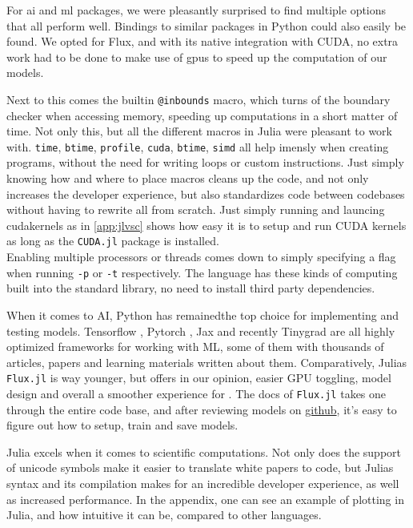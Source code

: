  For \acrshort{ai} and \acrshort{ml} packages, we were pleasantly surprised to find multiple options that all perform well. Bindings to similar packages in Python could also easily be found. We opted for Flux, and with its native integration with CUDA, no extra work had to be done to make use of \acrshort{gpu}s to speed up the computation of our models.

Next to this comes the builtin \texttt{@inbounds} macro, which turns of the boundary checker when accessing memory, speeding up computations in a short matter of time. Not only this, but all the different macros in Julia were pleasant to work with. \texttt{time}, \texttt{btime}, \texttt{profile}, \texttt{cuda}, \texttt{btime}, \texttt{simd} all help imensly when creating programs, without the need for writing loops or custom instructions. Just simply knowing how and where to place macros cleans up the code, and not only increases the developer experience, but also standardizes code between codebases without having to rewrite all from scratch. Just simply running and launcing cudakernels as in \ref{app:jlvsc} shows how easy it is to setup and run CUDA kernels as long as the \texttt{CUDA.jl} package is installed. \\

Enabling multiple processors or threads comes down to simply specifying a flag when running \texttt{-p} or \texttt{-t} respectively. The language has these kinds of computing built into the standard library, no need to install third party dependencies. 

When it comes to AI, Python has remainedthe top choice for implementing and testing models. Tensorflow \cite{abadi2016tensorflow}, Pytorch \cite{paszke2019pytorch}, Jax \cite{47008} and recently Tinygrad \cite{tinygrad} are all highly optimized frameworks for working with ML, some of them with thousands of articles, papers and learning materials written about them. Comparatively, Julias \texttt{Flux.jl} is way younger, but offers in our opinion, easier GPU toggling, model design and overall a smoother experience for . The docs of \texttt{Flux.jl} takes one through the entire code base, and after reviewing models on \href{https://github.com/FluxML/model-zoo}{github}, it's easy to figure out how to setup, train and save models.

Julia excels when it comes to scientific computations. Not only does the support of unicode symbols make it easier to translate white papers to code, but Julias syntax and its compilation makes for an incredible developer experience, as well as increased performance. In the appendix, one can see an example of plotting in Julia, and how intuitive it can be, compared to other languages.

